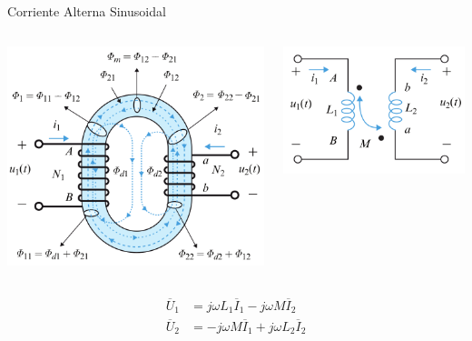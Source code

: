\documentclass[xcolor={usenames,svgnames,dvipsnames}]{beamer}
\begin{document}
\begin{frame}[label={sec:org81fd55d}]{Corriente Alterna Sinusoidal}
\begin{columns}
\begin{column}{0.5\columnwidth}
\begin{center}
\includegraphics[height=0.45\textheight]{figs/Acoplamiento2.png}
\end{center}
\end{column}

\begin{column}{0.5\columnwidth}
\begin{center}
\includegraphics[height=0.45\textheight]{figs/Acoplamiento2_circuito.png}
\end{center}
\end{column}
\end{columns}
\begin{align*}
  \overline{U}_1 &= j \omega L_1 \overline{I}_1 - j \omega M \overline{I}_2\\
  \overline{U}_2 &= - j \omega M \overline{I}_1 + j \omega L_2 \overline{I}_2
\end{align*}
\end{frame}
\end{document}
